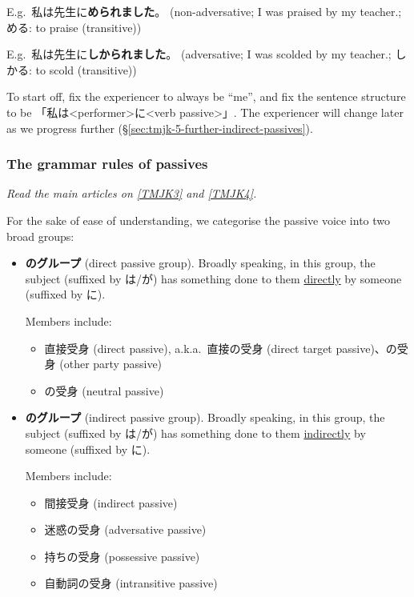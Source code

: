 \documentclass[../nihongo-gakushuu-kyouzai.tex]{subfiles}
\begin{document}
E.g.\ 私は先生に\textbf{められました}。 (non-adversative; I was praised by my teacher.; める: to praise (transitive))

E.g.\ 私は先生に\textbf{しかられました}。 (adversative; I was scolded by my teacher.; しかる: to scold (transitive))

To start off, fix the experiencer to always be ``me'', and fix the sentence structure to be 「私は<performer>に<verb passive>」. The experiencer will change later as we progress further (\S\ref{sec:tmjk-5-further-indirect-passives}).


\subsubsection{The grammar rules of passives} \label{sec:tmjk-3-4-grammar-rules-of-the-direct-indirect-possessive-intransitive-passives}
\emph{Read the main articles on \href{https://www.tomojuku.com/blog/passive/passive-4/}{[TMJK3]} and \href{https://www.tomojuku.com/blog/firstlesson1/passive-5/}{[TMJK4]}.}

For the sake of ease of understanding, we categorise the passive voice into two broad groups:
\begin{itemize}
    \item \textbf{のグループ} (direct passive group). Broadly speaking, in this group, the subject (suffixed by は/が) has something done to them \ul{directly} by someone (suffixed by に).

    Members include:
    \begin{itemize}
        \item 直接受身 (direct passive), a.k.a.\ 直接の受身 (direct target passive)、の受身 (other party passive)
        \item {}の受身 (neutral passive)
    \end{itemize}

    \item \textbf{のグループ} (indirect passive group). Broadly speaking, in this group, the subject (suffixed by は/が) has something done to them \ul{indirectly} by someone (suffixed by に).

    Members include:
    \begin{itemize}
        \item 間接受身 (indirect passive)
        \item 迷惑の受身 (adversative passive)
        \item 持ちの受身 (possessive passive)
        \item 自動詞の受身 (intransitive passive)
    \end{itemize}
\end{itemize}
\end{document}
